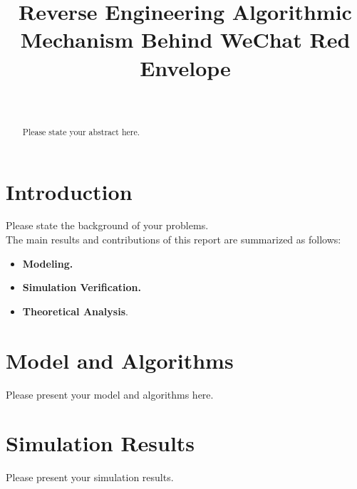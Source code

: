 \documentclass[10pt,journal]{IEEEtran}
\begin{document}
\title{Reverse Engineering Algorithmic Mechanism Behind WeChat Red Envelope}

\author{\\
} 
\maketitle

\begin{abstract}
Please state your abstract here.  
\end{abstract}


\section{Introduction}

Please state the background of your problems. \\

The main results and contributions of this report are summarized as follows:
\begin{itemize}
  \item \textbf{Modeling.  }
  \item \textbf{Simulation Verification.}
  \item \textbf{Theoretical Analysis}.    
\end{itemize}


\section{Model and Algorithms}

Please present your model and algorithms here. 



\section{Simulation Results}

Please present your simulation results. 
\end{document}
